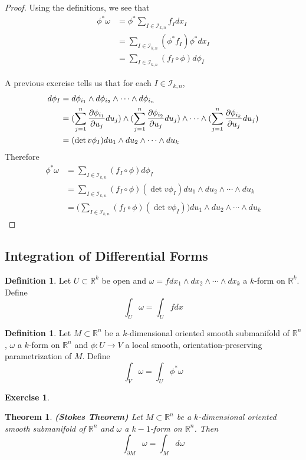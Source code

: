\documentclass[12pt]{amsart}
\newtheorem{thm}{Theorem}[subsection]
\theoremstyle{definition}
\newtheorem{defn}[definition]{Definition}
\theoremstyle{definition}
\newtheorem{ex}[definition]{Exercise}
\newcommand{\om}{\omega}
\newcommand{\R}{\mathbb{R}}
\newcommand{\MI}{\mathcal{I}}
\begin{document}
	\begin{proof}
		Using the definitions, we see that 
		\begin{align*}
			\phi^* \om 
			&= \phi^*  \sum_{I \in \MI_{k,n}} f_Idx_I \\
			&= \sum_{I \in \MI_{k,n}} (\phi^*f_I) \phi^*dx_I \\
			&= \sum_{I \in \MI_{k,n}} (f_I \circ  \phi)  d\phi_I
		\end{align*}
	
	A previous exercise tells us that for each $I \in \MI_{k,n}$,
	\begin{align*}
		d \phi_I 
		&= d\phi_{i_1} \wedge d\phi_{i_2} \wedge \cdots \wedge d \phi_{i_n} \\
		&= (\sum_{j = 1}^n \pdv{\phi_{i_1}}{u_j} du_j) \wedge (\sum_{j = 1}^n \pdv{\phi_{i_2}}{u_j} du_j) \wedge \cdots \wedge (\sum_{j = 1}^n \pdv{\phi_{i_k}}{u_j} du_j)   \\
		&= (\det v\phi_I)du_1 \wedge du_2 \wedge \cdots \wedge du_k
	\end{align*}
	Therefore 
	\begin{align*}
		\phi^* \om
		&= \sum_{I \in \MI_{k,n}} (f_I \circ  \phi)  d\phi_I \\
		&= \sum_{I \in \MI_{k,n}} (f_I \circ  \phi)  (\det v\phi_I)du_1 \wedge du_2 \wedge \cdots \wedge du_k \\
		&= \bigg(\sum_{I \in \MI_{k,n}} (f_I \circ  \phi)  (\det v\phi_I)\bigg)du_1 \wedge du_2 \wedge \cdots \wedge du_k
	\end{align*}
	\end{proof}
	
	\subsection{Integration of Differential Forms}
	
	\begin{defn}
		Let $U \subset \R^k$ be open and $\om = f dx_1 \wedge dx_2 \wedge \cdots \wedge dx_k$ a $k$-form on $\R^k$. Define $$\int_U \om = \int_U f dx$$
	\end{defn}
	
	\begin{defn}
		Let $M \subset \R^n$ be a $k$-dimensional oriented smooth submanifold of $\R^n$, $\om$ a $k$-form on $\R^n$ and $\phi: U \rightarrow V$ a local smooth, orientation-preserving parametrization of $M$. Define $$\int_V \om = \int_U \phi^*\om $$
	\end{defn} 

	\begin{ex}
		
	\end{ex}

	\begin{thm}{\textbf{(Stokes Theorem)}}
		Let $M \subset \R^n$ be a $k$-dimensional oriented smooth submanifold of $\R^n$ and $\om$ a $k-1$-form on $\R^n$. Then $$\int_{\partial M} \om = \int_M d \om$$
	\end{thm}
\end{document}
